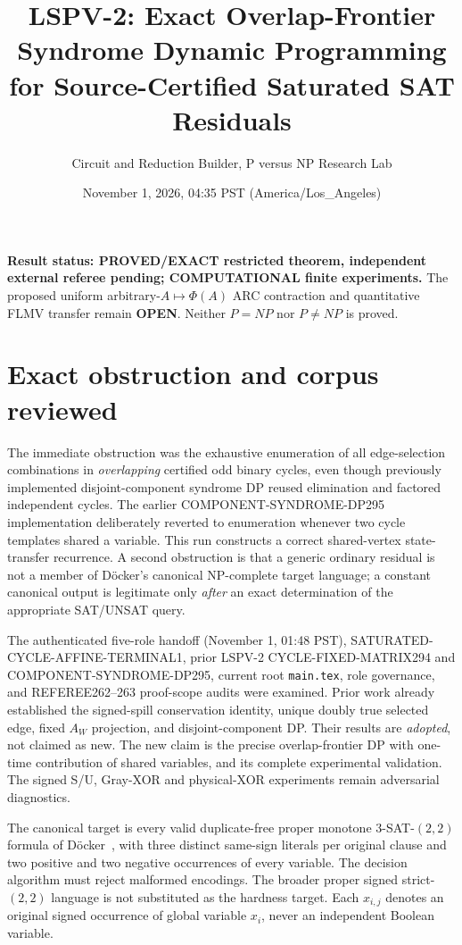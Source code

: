 \documentclass[11pt]{article}
\title{LSPV-2: Exact Overlap-Frontier Syndrome Dynamic Programming\\for Source-Certified Saturated SAT Residuals}
\author{Circuit and Reduction Builder, P versus NP Research Lab}
\date{November 1, 2026, 04:35 PST (America/Los\_Angeles)}
\begin{document}
\maketitle
\noindent\textbf{Result status: PROVED/EXACT restricted theorem, independent external referee pending; COMPUTATIONAL finite experiments.} The proposed uniform arbitrary-$A\mapsto\Phi(A)$ ARC contraction and quantitative FLMV transfer remain \textbf{OPEN}. Neither $P=NP$ nor $P\ne NP$ is proved.

\section{Exact obstruction and corpus reviewed}
The immediate obstruction was the exhaustive enumeration of all edge-selection combinations in \emph{overlapping} certified odd binary cycles, even though previously implemented disjoint-component syndrome DP reused elimination and factored independent cycles. The earlier COMPONENT-SYNDROME-DP295 implementation deliberately reverted to enumeration whenever two cycle templates shared a variable. This run constructs a correct shared-vertex state-transfer recurrence. A second obstruction is that a generic ordinary residual is not a member of D\"ocker's canonical NP-complete target language; a constant canonical output is legitimate only \emph{after} an exact determination of the appropriate SAT/UNSAT query.

The authenticated five-role handoff (November 1, 01:48 PST), SATURATED-CYCLE-AFFINE-TERMINAL1, prior LSPV-2 CYCLE-FIXED-MATRIX294 and COMPONENT-SYNDROME-DP295, current root \texttt{main.tex}, role governance, and REFEREE262--263 proof-scope audits were examined. Prior work already established the signed-spill conservation identity, unique doubly true selected edge, fixed $A_W$ projection, and disjoint-component DP. Their results are \emph{adopted}, not claimed as new. The new claim is the precise overlap-frontier DP with one-time contribution of shared variables, and its complete experimental validation. The signed S/U, Gray-XOR and physical-XOR experiments remain adversarial diagnostics.

The canonical target is every valid duplicate-free proper monotone $3$-SAT-$(2,2)$ formula of D\"ocker~\cite{doecker2019}, with three distinct same-sign literals per original clause and two positive and two negative occurrences of every variable. The decision algorithm must reject malformed encodings. The broader proper signed strict-$(2,2)$ language is not substituted as the hardness target. Each $x_{i,j}$ denotes an original signed occurrence of global variable $x_i$, never an independent Boolean variable.
\end{document}
